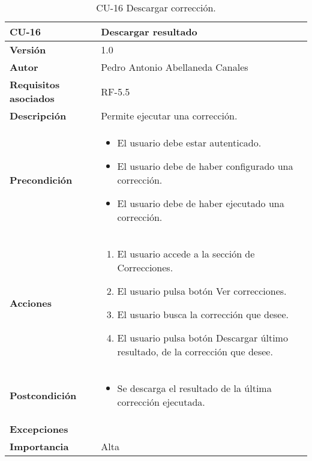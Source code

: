 \begin{table}[p]
	\centering
	\begin{tabularx}{\linewidth}{ p{} p{} }
		\toprule
		\textbf{CU-16}    & \textbf{Descargar resultado} \\
		\midrule
		\textbf{Versión}              & 1.0    \\
		\textbf{Autor}                & Pedro Antonio Abellaneda Canales \\
		\textbf{Requisitos asociados} & RF-5.5 \\
		\textbf{Descripción}          & Permite ejecutar una corrección. \\
		\textbf{Precondición}         & \begin{itemize}
                                        \tightlist
		                                  \item El usuario debe estar autenticado.
		                                  \item El usuario debe de haber configurado una corrección.
		                                  \item El usuario debe de haber ejecutado una corrección.
		                                 \end{itemize} \\
		\textbf{Acciones}             &
                            		\begin{enumerate}
                            			\def\labelenumi{\arabic{enumi}.}
                            			\tightlist
                            			\item El usuario accede a la sección de Correcciones.
                                        \item El usuario pulsa botón Ver correcciones.
                                        \item El usuario busca la corrección que desee.
                                        \item El usuario pulsa botón Descargar último resultado, de la corrección que desee.
                            		\end{enumerate} \\
		\textbf{Postcondición}        & \begin{itemize}
                                        \tightlist
		                                  \item Se descarga el resultado de la última corrección ejecutada.
		                                 \end{itemize} \\
		\textbf{Excepciones}         &  \\
		\textbf{Importancia}          & Alta \\
		\bottomrule
	\end{tabularx}
	\caption{CU-16 Descargar corrección.}
	\label{tab:CU-16}
\end{table}
